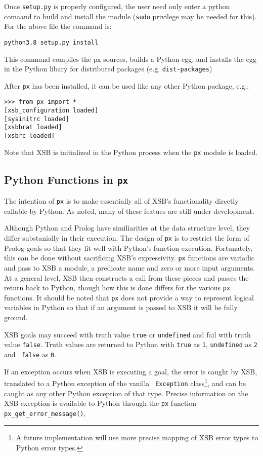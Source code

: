 Once {\tt setup.py} is properly configured, the user need only enter a
python comaand to build and install the module ({\tt sudo} privilege
may be needed for this).  For the above file the command is:

\begin{verbatim}
python3.8 setup.py install
\end{verbatim}
\noindent
This command compiles the px sources, builds a Python egg, and
installs the egg in the Python libary for distributed packages
(e.g. {\tt dist-packages})

After {\tt px} has been installed, it can be used like any other Python
package, e.g.:

\begin{verbatim}
>>> from px import *
[xsb_configuration loaded]
[sysinitrc loaded]
[xsbbrat loaded]
[xsbrc loaded]
\end{verbatim}
\noindent
Note that XSB is initialized in the Python process when the {\tt px}
module is loaded.

\subsection{Python Functions in {\tt px}}

The intention of {\tt px} is to make essentially all of XSB's
functionality directly callable by Python.  As noted, many of these
featues are still under development.

Although Python and Prolog have similiarities at the data structure
level, they differ substanially in their execution.  The design of
{\tt px} is to restrict the form of Prolog goals so that they fit well
with Python's function execution.  Fortunately, this can be done
without sacrificing XSB's expressivity.  {\tt px} functions are
variadic and pass to XSB a module, a predicate name and zero or more
input arguments.  At a general level, XSB then constructs a call from
these pieces and passes the return back to Python, though how this is
done differs for the various {\tt px} functions.  It should be noted
that {\tt px} does not provide a way to represent logical variables in
Python so that if an argument is passed to XSB it will be fully
ground.

XSB goals may succeed with truth value {\tt true} or {\tt undefined}
and fail with truth value {\tt false}.  Truth values are returned to
Python with {\tt true} as {\tt 1}, {\tt undefined} as {\tt 2} and {\tt
  false} as {\tt 0}.

If an exception occurs when XSB is executing a goal, the error is
caught by XSB, translated to a Python exception of the vanilla {\tt
  Exception} class\footnote{A future implementation will use more
  precise mapping of XSB error types to Python error types.}, and can
be caught as any other Python exception of that type.  Precise
information on the XSB exception is available to Python through the
{\tt px} function {\tt px\_get\_error\_message()},

